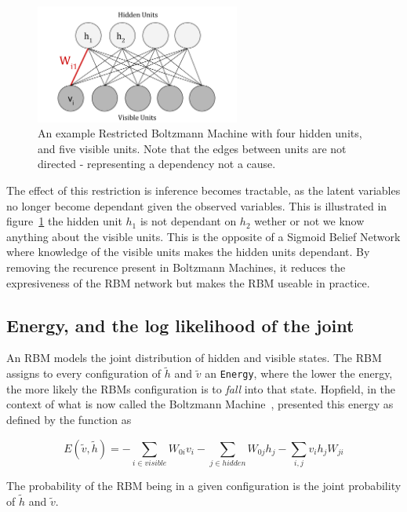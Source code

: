   \begin{figure}[h]
  \begin{center}
    \includegraphics[width = 0.6\textwidth]{Assets/RBM_Example.png}
  \caption{An example Restricted Boltzmann Machine with four hidden units, and five visible units. Note that the edges between units are not directed - representing a dependency not a cause. }
  \label{F:Restricted-Boltzmann-Machine}
  \end{center}
  \end{figure}

 The effect of this restriction is inference becomes tractable, as the latent variables no longer become dependant given the observed variables. This is illustrated in figure~\ref{F:Restricted-Boltzmann-Machine} the hidden unit $h_1$ is not dependant on $h_2$ wether or not we know anything about the visible units. This is the opposite of a Sigmoid Belief Network where knowledge of the visible units makes the hidden units dependant. By removing the recurence present in Boltzmann Machines, it reduces the expresiveness of the RBM network but makes the RBM useable in practice.


  \subsection{Energy, and the log likelihood of the joint}

  An RBM models the joint distribution of hidden and visible states.
  The RBM assigns to every configuration of $\tilde{h}$ and $\tilde{v}$ an \texttt{Energy}, where the lower the energy, the more likely the RBMs configuration is to \textit{fall} into that state. Hopfield, in the context of what is now called the Boltzmann Machine~\cite{Hopfield01041982}, presented this energy as defined by the function as

  $$ E(\tilde{v},\tilde{h}) = -\sum_{i \in visible}{W_{0i}v_i}   -\sum_{j \in hidden}{W_{0j}h_j}  -\sum_{i,j}{v_ih_jW_{ji}}  $$

  The probability of the RBM being in a given configuration is the joint probability of $\tilde{h}$ and $\tilde{v}$.


